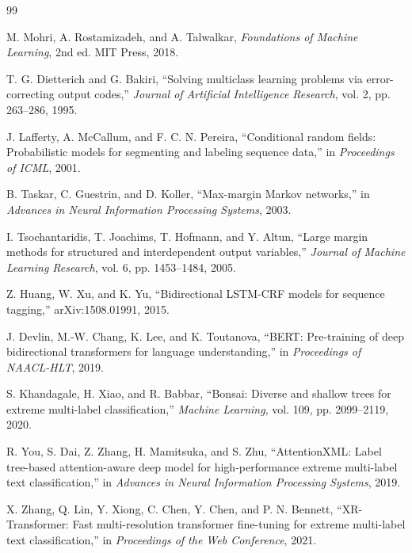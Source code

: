 \newpage
\begin{thebibliography}{99}

  M. Mohri, A. Rostamizadeh, and A. Talwalkar,
  \textit{Foundations of Machine Learning}, 2nd ed.
  MIT Press, 2018.

  T. G. Dietterich and G. Bakiri,
  ``Solving multiclass learning problems via error-correcting output codes,''
  \textit{Journal of Artificial Intelligence Research}, vol. 2, pp. 263--286, 1995.

  J. Lafferty, A. McCallum, and F. C. N. Pereira,
  ``Conditional random fields: Probabilistic models for segmenting and labeling sequence data,''
  in \textit{Proceedings of ICML}, 2001.

  B. Taskar, C. Guestrin, and D. Koller,
  ``Max-margin Markov networks,''
  in \textit{Advances in Neural Information Processing Systems}, 2003.

  I. Tsochantaridis, T. Joachims, T. Hofmann, and Y. Altun,
  ``Large margin methods for structured and interdependent output variables,''
  \textit{Journal of Machine Learning Research}, vol. 6, pp. 1453--1484, 2005.

  Z. Huang, W. Xu, and K. Yu,
  ``Bidirectional LSTM-CRF models for sequence tagging,''
  arXiv:1508.01991, 2015.

  J. Devlin, M.-W. Chang, K. Lee, and K. Toutanova,
  ``BERT: Pre-training of deep bidirectional transformers for language understanding,''
  in \textit{Proceedings of NAACL-HLT}, 2019.

  S. Khandagale, H. Xiao, and R. Babbar,
  ``Bonsai: Diverse and shallow trees for extreme multi-label classification,''
  \textit{Machine Learning}, vol. 109, pp. 2099--2119, 2020.

  R. You, S. Dai, Z. Zhang, H. Mamitsuka, and S. Zhu,
  ``AttentionXML: Label tree-based attention-aware deep model for high-performance extreme multi-label text classification,''
  in \textit{Advances in Neural Information Processing Systems}, 2019.

  X. Zhang, Q. Lin, Y. Xiong, C. Chen, Y. Chen, and P. N. Bennett,
  ``XR-Transformer: Fast multi-resolution transformer fine-tuning for extreme multi-label text classification,''
  in \textit{Proceedings of the Web Conference}, 2021.


\end{thebibliography}
